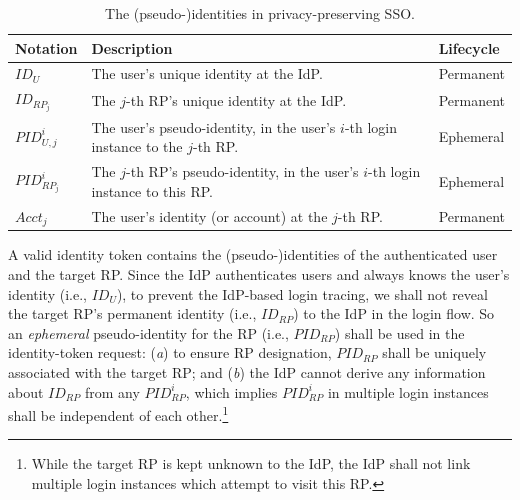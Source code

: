 \begin{table}[t]
\footnotesize
    \caption{The (pseudo-)identities in privacy-preserving SSO.}
    \centering
    \begin{tabular}{|p{1.0cm}|p{5.1cm}|p{1.13cm}|} \hline
    {\textbf{Notation}} & {\textbf{Description}} & {\textbf{Lifecycle}} \\ \hline
    {$ID_U$} & {The user's unique identity at the IdP.} & {Permanent} \\ \hline
    {$ID_{RP_j}$} & {The $j$-th RP's unique identity at the IdP.} & {Permanent} \\ \hline
    {$PID_{U,j}^i$} & {The user's pseudo-identity, in the user's $i$-th login instance to the $j$-th RP.} & {Ephemeral} \\ \hline
    {$PID_{RP_j}^i$} & {The $j$-th RP's pseudo-identity, in the user's $i$-th login instance to this RP.} & {Ephemeral} \\ \hline
    {$Acct_j$} & {The user's identity (or account) at the $j$-th RP.} & {Permanent} \\ \hline
    \end{tabular}
    \label{tbl:notations-dilemma}
\end{table}


A valid identity token contains the (pseudo-)identities of the authenticated user and the target RP. %
Since the IdP authenticates users and always knows the user's identity (i.e., $ID_U$),
    to prevent the IdP-based login tracing,
    we shall not reveal the target RP's permanent identity (i.e., $ID_{RP}$) to the IdP in the login flow.
So an \emph{ephemeral} pseudo-identity for the RP (i.e., $PID_{RP}$) shall be used in the identity-token request:
(\emph{a}) to ensure RP designation,
     $PID_{RP}$ shall be uniquely associated with the target RP;
    and (\emph{b}) the IdP cannot derive any information about $ID_{RP}$ from any $PID_{RP}^i$,
        which implies $PID_{RP}^i$ in multiple login instances shall
         be independent of each other.\footnote{While the target RP is kept unknown to the IdP,
            the IdP shall not link multiple login instances which attempt to visit this RP.}

